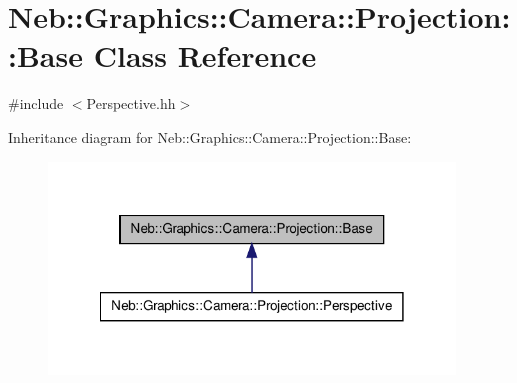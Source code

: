 \hypertarget{classNeb_1_1Graphics_1_1Camera_1_1Projection_1_1Base}{\section{\-Neb\-:\-:\-Graphics\-:\-:\-Camera\-:\-:\-Projection\-:\-:\-Base \-Class \-Reference}
\label{classNeb_1_1Graphics_1_1Camera_1_1Projection_1_1Base}
}


 




{\ttfamily \#include $<$\-Perspective.\-hh$>$}



\-Inheritance diagram for \-Neb\-:\-:\-Graphics\-:\-:\-Camera\-:\-:\-Projection\-:\-:\-Base\-:\nopagebreak
\begin{figure}[H]
\begin{center}
\leavevmode
\includegraphics[width=306pt]{classNeb_1_1Graphics_1_1Camera_1_1Projection_1_1Base__inherit__graph}
\end{center}
\end{figure}
